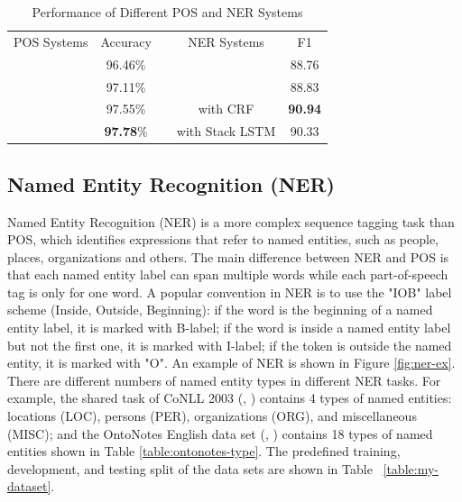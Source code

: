 \begin{table}[]
\centering
\caption{Performance of Different POS and NER Systems}
\label{table:my-performance}
\begin{tabular}{cclcc}
POS Systems       & Accuracy &  & NER Systems           & F1
\\ \cline{1-2} \cline{4-5} 
\text{\cite{mccallum2000maximum}} & 96.46\%                      &  & \text{\cite{florian2003named}}                 & 88.76                  \\
\text{\cite{collins2002discriminative}}    & 97.11\%                      &  & \text{\cite{huang2015bidirectional}}           & 88.83                  \\
\text{\cite{huang2015bidirectional}}       & 97.55\%                      &  & \text{\cite{lample2016neural}} with CRF        & \textbf{90.94}                 \\
\text{\cite{ling2015finding}}              & \textbf{97.78}\%                      &  & \text{\cite{lample2016neural}} with Stack LSTM & 90.33                 
\end{tabular}
\end{table}



\subsection{Named Entity Recognition (NER)}

Named Entity Recognition (NER) is a more complex sequence tagging task than POS, which identifies expressions
that refer to named entities, such as people, places, organizations and others. The main difference between NER and POS is that each named entity label can span multiple words while each part-of-speech tag is only for one word. A popular convention in NER is to use the "IOB" label scheme (Inside, Outside, Beginning): if the word is the beginning of a named entity label, it is marked with B-label; if the word is inside a named entity label but not the first one, it is marked with I-label; if the token is outside the named entity, it is marked with "O". An example of NER is shown in Figure \ref{fig:ner-ex}. There are different numbers of named entity types in different NER tasks. For example, the shared task of CoNLL 2003 (\citeauthor{tjong2003introduction}, \citeyear{tjong2003introduction}) contains 4 types of named entities: locations (LOC), persons (PER), organizations (ORG), and miscellaneous (MISC); and the OntoNotes English data set (\citeauthor{hovy2006ontonotes}, \citeyear{hovy2006ontonotes}) contains 18 types of named entities shown in Table \ref{table:ontonotes-type}. The predefined training, development, and testing split of the data sets are shown in Table ~\ref{table:my-dataset}.


